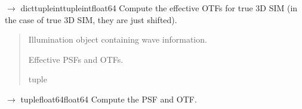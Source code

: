 \documentclass[letterpaper,10pt,english]{sphinxmanual}
\begin{document}
\begin{fulllineitems}
\begin{fulllineitems}
\label{\detokenize{source/OpticalSystems:OpticalSystems.OpticalSystem3D.compute_effective_otfs_true_3dSIM}}
\pysigstartsignatures
\pysiglinewithargsret
{}
{}
{{ $\rightarrow$ dict\DUrole{p}{{[}}tuple\DUrole{p}{{[}}inttuple\DUrole{p}{{[}}int\DUrole{p}{{]}}\DUrole{p}{{]}}float64\DUrole{p}{{]}}}}
\pysigstopsignatures
\sphinxAtStartPar
Compute the effective OTFs for true 3D SIM
(in the case of true 3D SIM, they are just shifted).
\begin{quote}\begin{description}
\sphinxAtStartPar
{} \textendash{} Illumination object containing wave information.

\sphinxAtStartPar
Effective PSFs and OTFs.

\sphinxAtStartPar
tuple

\end{description}\end{quote}

\end{fulllineitems}


\begin{fulllineitems}
\label{\detokenize{source/OpticalSystems:OpticalSystems.OpticalSystem3D.compute_psf_and_otf}}
\pysigstartsignatures
\pysiglinewithargsret
{}
{}
{{ $\rightarrow$ tuple\DUrole{p}{{[}}float64float64\DUrole{p}{{]}}}}
\pysigstopsignatures
\sphinxAtStartPar
Compute the PSF and OTF.

\end{fulllineitems}



\end{fulllineitems}
\end{document}
